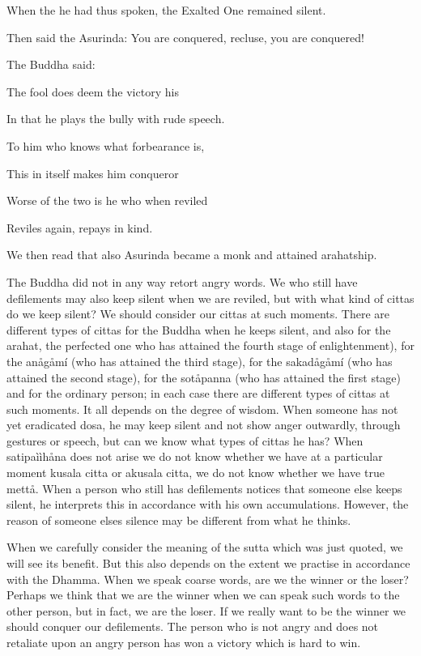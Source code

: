 \documentclass[12pt,twoside]{article}
\begin{document}
When the he had thus spoken, the Exalted One remained silent. 

Then said the Asurinda: {\textasciigrave}{\textasciigrave}You are
conquered, recluse, you are
conquered!{\textquotesingle}{\textquotesingle}

The Buddha said:


\bigskip

The fool does deem the victory his

In that he plays the bully with rude speech.

To him who knows what forbearance is,

This in itself makes him conqueror

Worse of the two is he who when reviled

Reviles again, repays in kind. 


\bigskip

We then read that also Asurinda became a monk and attained arahatship. 

The Buddha did not in any way retort angry words. We who still have
defilements may also keep silent when we are reviled, but with what
kind of cittas do we keep silent? We should consider our cittas at such
moments. There are different types of cittas for the Buddha when he
keeps silent, and also for the arahat, the perfected one who has
attained the fourth stage of enlightenment), for the an{\aa}g{\aa}m\'i
(who has attained the third stage), for the sakad{\aa}g{\aa}m\'i (who
has attained the second stage), for the sot{\aa}panna (who has attained
the first stage) and for the ordinary person; in each case there are
different types of cittas at such moments. It all depends on the degree
of wisdom. When someone has not yet eradicated dosa, he may keep silent
and not show anger outwardly, through gestures or speech, but can we
know what types of cittas he has? When satipa\`i\`ih{\aa}na does not
arise we do not know whether we have at a particular moment kusala
citta or akusala citta, we do not know whether we have true mett{\aa}.
When a person who still has defilements notices that someone else keeps
silent, he interprets this in accordance with his own accumulations.
However, the reason of someone else{\textquotesingle}s silence may be
different from what he thinks. 

When we carefully consider the meaning of the sutta which was just
quoted, we will see its benefit. But this also depends on the extent we
practise in accordance with the Dhamma. When we speak coarse words, are
we the winner or the loser? Perhaps we think that we are the winner
when we can speak such words to the other person, but in fact, we are
the loser. If we really want to be the winner we should conquer our
defilements. The person who is not angry and does not retaliate upon an
angry person has won a victory which is hard to win. 
\end{document}
